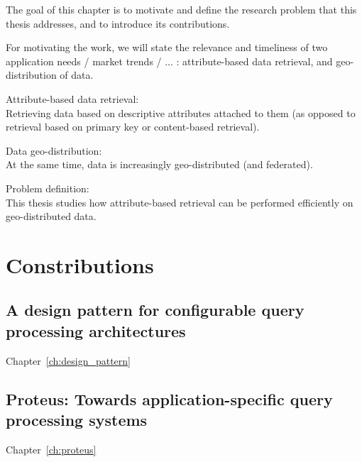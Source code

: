 The goal of this chapter is to motivate and define the research problem that
this thesis addresses, and to introduce its contributions.

For motivating the work, we will state the relevance and timeliness of two
application needs / market trends / ... : attribute-based data retrieval, and
geo-distribution of data.

Attribute-based data retrieval: \\
Retrieving data based on descriptive attributes attached to them (as opposed to
retrieval based on primary key or content-based retrieval).

Data geo-distribution: \\
At the same time, data is increasingly geo-distributed (and federated).

Problem definition: \\
This thesis studies how attribute-based retrieval can be performed efficiently
on geo-distributed data.


\section{Constributions}
\subsection{A design pattern for configurable query processing architectures}
Chapter~\ref{ch:design_pattern}

\subsection{Proteus: Towards application-specific query processing systems}
Chapter~\ref{ch:proteus}